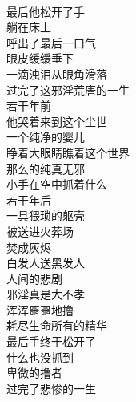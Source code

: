 \begin{poem}[尘世卑微的撸者]
    \begin{multicols}{2}
        \centering~\\
        最后他松开了手 \\ 躺在床上 \\ 呼出了最后一口气 \\ 眼皮缓缓垂下 \\ 一滴浊泪从眼角滑落 \\ 过完了这邪淫荒唐的一生 \\ 若干年前 \\ 他哭着来到这个尘世 \\ 一个纯净的婴儿 \\ 睁着大眼睛瞧着这个世界 \\ 那么的纯真无邪 \\ 小手在空中抓着什么 \\ 若干年后 \\ 一具猥琐的躯壳 \\ 被送进火葬场 \\ 焚成灰烬 \\ 白发人送黑发人 \\ 人间的悲剧 \\ 邪淫真是大不孝 \\ 浑浑噩噩地撸 \\ 耗尽生命所有的精华 \\ 最后手终于松开了 \\ 什么也没抓到 \\ 卑微的撸者 \\ 过完了悲惨的一生
    \end{multicols}
\end{poem}

